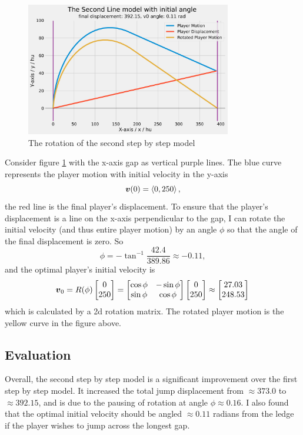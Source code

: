 \begin{figure}[H]
    \centering
    \includegraphics[width=0.8\textwidth]{assets/step_by_step_edge.png}
    \caption{The rotation of the second step by step model}
    \label{fig:sbsedge}
\end{figure}


Consider figure \ref{fig:sbsedge} with the x-axis gap as vertical purple lines. The blue curve represents the player motion with initial velocity in the y-axis
\[
    \boldsymbol{v}(0) = \left\langle 0, 250 \right\rangle,
\]
the red line is the final player's displacement. To ensure that the player's displacement is a line on the x-axis perpendicular to the gap, I can rotate the initial velocity (and thus entire player motion) by an angle $\phi$ so that the angle of the final displacement is zero. So
\[
    \phi = -\tan^{-1} \frac{42.4}{389.86} \approx -0.11,
\]
and the optimal player's initial velocity is
\[
    \boldsymbol{v}_0 = R(\phi)\begin{bmatrix}0\\250 \end{bmatrix} = \begin{bmatrix}
        \cos \phi & -\sin \phi \\
        \sin \phi & \cos \phi
    \end{bmatrix}\begin{bmatrix}0\\250 \end{bmatrix} \approx \begin{bmatrix}27.03\\248.53 \end{bmatrix}
\]
which is calculated by a 2d rotation matrix. The rotated player motion is the yellow curve in the figure above.

\subsection{Evaluation}
Overall, the second step by step model is a significant improvement over the first step by step model. It increased the total jump displacement from $\approx 373.0$ to $\approx 392.15$, and is due to the pausing of rotation at angle $\phi \approx 0.16$. I also found that the optimal initial velocity should be angled $\approx 0.11$ radians from the ledge if the player wishes to jump across the longest gap.

